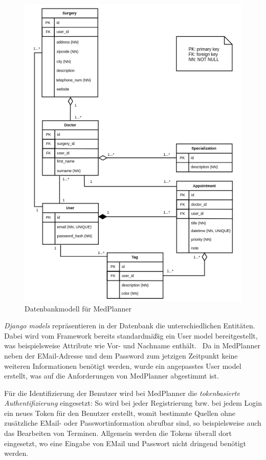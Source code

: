 \documentclass[conference]{IEEEtran}
\begin{document}
\begin{figure}[!h]
	\centering
	\includegraphics[width=\columnwidth]{./figures/concepts}
	\caption{Datenbankmodell für MedPlanner}
\end{figure}
\textit{Django models} repräsentieren in der Datenbank die unterschiedlichen Entitäten. Dabei wird vom Framework bereits standardmäßig ein User model bereitgestellt, was beispielsweise Attribute wie Vor- und Nachname enthält.~\cite{django-default-user} Da in MedPlanner neben der EMail-Adresse und dem Password zum jetzigen Zeitpunkt keine weiteren Informationen benötigt werden, wurde ein angepasstes User model erstellt, was auf die Anforderungen von MedPlanner abgestimmt ist.

Für die Identifizierung der Benutzer wird bei MedPlanner die \textit{tokenbasierte Authentifizierung} eingesetzt: So wird bei jeder Registrierung bzw. bei jedem Login ein neues Token für den Benutzer erstellt, womit bestimmte Quellen ohne zusätzliche EMail- oder Passwortinformation abrufbar sind, so beispielsweise auch das Bearbeiten von Terminen. Allgemein werden die Tokens überall dort eingesetzt, wo eine Eingabe von EMail und Passwort nicht dringend benötigt werden.
\pagebreak
\end{document}
